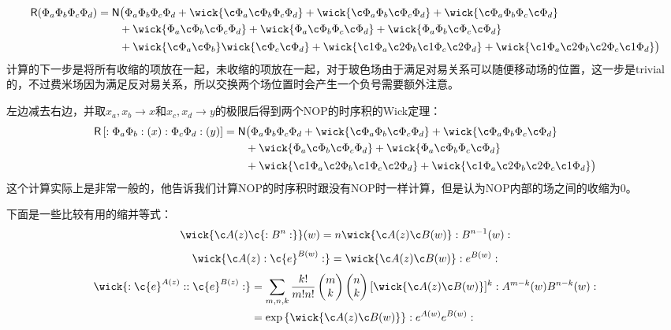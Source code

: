 \begin{example}
	\begin{equation}
		\begin{aligned}\mathsf{R}(\Phi_a\Phi_b\Phi_c\Phi_d)&=\mathsf{N}\big(\Phi_a\Phi_b\Phi_c\Phi_d+\wick{\c \Phi_a\c\Phi_b\Phi_c\Phi_d}+\wick{\c\Phi_a\Phi_b\c\Phi_c\Phi_d}+\wick{\c\Phi_a\Phi_b\Phi_c\c\Phi_d}\\&\quad\quad+\wick{\Phi_a\c\Phi_b\c\Phi_c\Phi_d}+\wick{\Phi_a\c\Phi_b\Phi_c\c\Phi_d}+\wick{\Phi_a\Phi_b\c\Phi_c\c\Phi_d}\\&\quad\quad+\wick{\c\Phi_a\c\Phi_b}\wick{\c\Phi_c\c\Phi_d}+\wick{\c1\Phi_a\c2\Phi_b\c1\Phi_c\c2\Phi_d}+\wick{\c1\Phi_a\c2\Phi_b\c2\Phi_c\c1\Phi_d}\big)\end{aligned}
	\end{equation}
	计算的下一步是将所有收缩的项放在一起，未收缩的项放在一起，对于玻色场由于满足对易关系可以随便移动场的位置，这一步是trivial的，不过费米场因为满足反对易关系，所以交换两个场位置时会产生一个负号需要额外注意。
	
	左边减去右边，并取$x_a,x_b\to x$和$x_c,x_d\to y$的极限后得到两个NOP的时序积的Wick定理：
	\begin{equation}\label{33.6}
		\begin{aligned}
			\mathsf{R}\left[:\Phi_a\Phi_b:(x):\Phi_c\Phi_d:(y)\right]&=\mathsf{N}\big(\Phi_a\Phi_b\Phi_c\Phi_d+\wick{\c\Phi_a\Phi_b\c\Phi_c\Phi_d}+\wick{\c\Phi_a\Phi_b\Phi_c\c\Phi_d}\\&\quad\quad+\wick{\Phi_a\c\Phi_b\c\Phi_c\Phi_d}+\wick{\Phi_a\c\Phi_b\Phi_c\c\Phi_d}\\&\quad\quad+\wick{\c1\Phi_a\c2\Phi_b\c1\Phi_c\c2\Phi_d}+\wick{\c1\Phi_a\c2\Phi_b\c2\Phi_c\c1\Phi_d}\big)
		\end{aligned}
	\end{equation}
	这个计算实际上是非常一般的，他告诉我们计算NOP的时序积时跟没有NOP时一样计算，但是认为NOP内部的场之间的收缩为0。
\end{example}
\begin{remark}
	下面是一些比较有用的缩并等式：
	\begin{equation}
		\wick{\c A(z)\c{:B^{n}:}}(w)=n\wick{\c A(z)\c B(w)}:B^{n-1}(w):
	\end{equation}
	\begin{equation}
		\wick{\c A(z):\c {e}^{B(w)}:}=\wick{\c A(z)\c B(w)}:e^{B(w)}:
	\end{equation}
	\begin{equation}\label{33.9}
		\begin{aligned}
			\wick{:\c{e}^{A(z)}::\c{e}^{B(z)}:}&=\sum_{m,n,k}\frac{k!}{m!n!}\begin{pmatrix}m\\k\end{pmatrix}\begin{pmatrix}n\\k\end{pmatrix}[\wick {\c A(z)\c B(w)}]^k:A^{m-k}(w)B^{n-k}(w):\\&=\exp\left\{\wick{\c A(z)\c B(w)}\right\}:e^{A(w)}e^{B(w)}:\end{aligned}
	\end{equation}
\end{remark}
